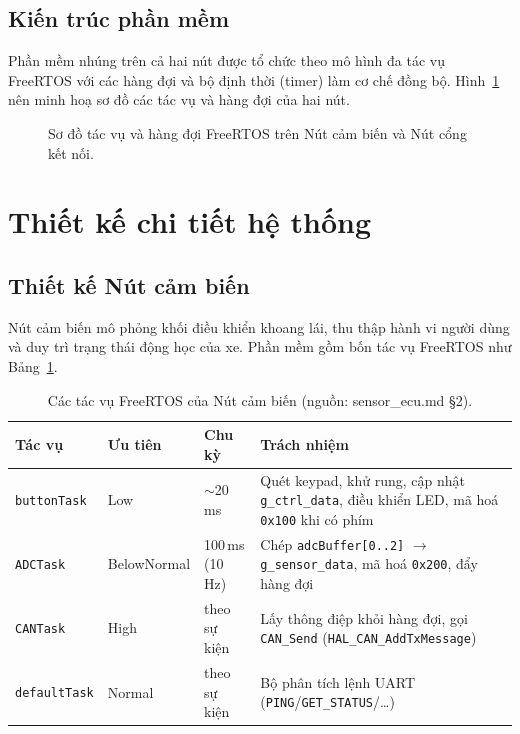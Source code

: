 \documentclass[../DoAn.tex]{subfiles}
\begin{document}

\subsection{Kiến trúc phần mềm}
\label{section:4.1.3}

Phần mềm nhúng trên cả hai nút được tổ chức theo mô hình đa tác vụ FreeRTOS với
các hàng đợi và bộ định thời (timer) làm cơ chế đồng bộ. Hình~\ref{fig:rtos-task}
nên minh hoạ sơ đồ các tác vụ và hàng đợi của hai nút.

\begin{figure}[H]
  \centering
  \caption{Sơ đồ tác vụ và hàng đợi FreeRTOS trên Nút cảm biến và Nút cổng kết nối.}
  \label{fig:rtos-task}
\end{figure}

\section{Thiết kế chi tiết hệ thống}
\label{section:4.2}

\subsection{Thiết kế Nút cảm biến}
\label{section:4.2.1}

Nút cảm biến mô phỏng khối điều khiển khoang lái, thu thập hành vi người dùng và
duy trì trạng thái động học của xe. Phần mềm gồm bốn tác vụ FreeRTOS như
Bảng~\ref{tab:sensor-tasks}.

\begin{table}[H]
  \centering
  \caption{Các tác vụ FreeRTOS của Nút cảm biến (nguồn: sensor\_ecu.md §2).}
  \label{tab:sensor-tasks}
  \begin{tabular}{@{}p{3.0cm}p{2.0cm}p{2.4cm}p{4.4cm}@{}}
    \toprule
    \textbf{Tác vụ} & \textbf{Ưu tiên} & \textbf{Chu kỳ} & \textbf{Trách nhiệm} \\
    \midrule
    \texttt{buttonTask} & Low & $\sim$20\,ms & Quét keypad, khử rung, cập nhật
      \texttt{g\_ctrl\_data}, điều khiển LED, mã hoá \texttt{0x100} khi có phím \\
    \texttt{ADCTask} & BelowNormal & 100\,ms (10\,Hz) & Chép
      \texttt{adcBuffer[0..2]} $\to$ \texttt{g\_sensor\_data}, mã hoá
      \texttt{0x200}, đẩy hàng đợi \\
    \texttt{CANTask} & High & theo sự kiện & Lấy thông điệp khỏi hàng đợi, gọi
      \texttt{CAN\_Send} (\texttt{HAL\_CAN\_AddTxMessage}) \\
    \texttt{defaultTask} & Normal & theo sự kiện & Bộ phân tích lệnh UART
      (\texttt{PING}/\texttt{GET\_STATUS}/\dots) \\
    \bottomrule
  \end{tabular}
\end{table}
\end{document}
